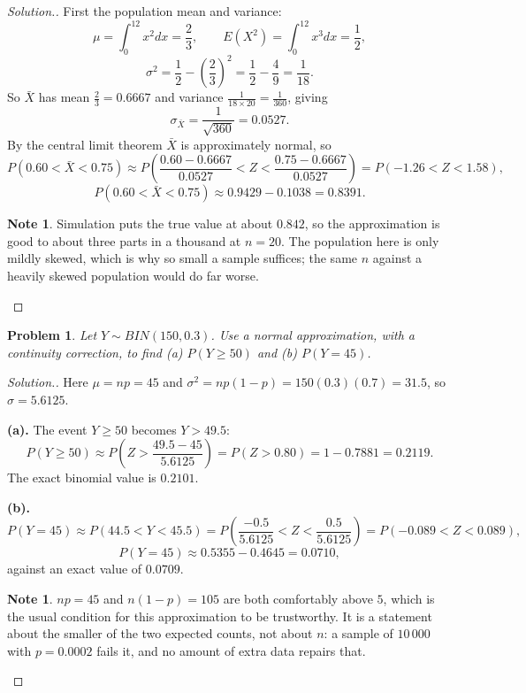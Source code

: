 \documentclass[12pt,a4paper]{report}
\theoremstyle{definition}
\newtheorem{note}[thm]{Note}
\theoremstyle{plain}
\newtheorem{problemx}{Problem}[section]
\newenvironment{problem}{\begin{problemx}}{\end{problemx}}
\newenvironment{solution}
  {\renewcommand{\qedsymbol}{}\begin{proof}[\textit{Solution}.]}
  {\end{proof}}
\begin{document}
\begin{solution}
First the population mean and variance:
\[\mu=\int_0^12x^2dx=\frac23,\qquad
E\left(X^2\right)=\int_0^12x^3dx=\frac12,\]
\[\sigma^2=\frac12-\left(\frac23\right)^2=\frac12-\frac49=\frac{1}{18}.\]
So $\bar X$ has mean $\frac23=0.6667$ and variance
$\frac{1}{18\times20}=\frac{1}{360}$, giving
\[\sigma_{\bar X}=\frac{1}{\sqrt{360}}=0.0527.\]
By the central limit theorem $\bar X$ is approximately normal, so
\[P\left(0.60<\bar X<0.75\right)
\approx P\!\left(\frac{0.60-0.6667}{0.0527}<Z<\frac{0.75-0.6667}{0.0527}\right)
=P(-1.26<Z<1.58),\]
\[P\left(0.60<\bar X<0.75\right)\approx0.9429-0.1038=0.8391.\]

\begin{note}
Simulation puts the true value at about $0.842$, so the approximation is good to
about three parts in a thousand at $n=20$. The population here is only mildly
skewed, which is why so small a sample suffices; the same $n$ against a heavily
skewed population would do far worse.
\end{note}
\end{solution}

\begin{problem}
Let $Y\sim BIN(150,0.3)$. Use a normal approximation, with a continuity
correction, to find (a) $P(Y\geq50)$ and (b) $P(Y=45)$.
\end{problem}

\begin{solution}
Here $\mu=np=45$ and $\sigma^2=np(1-p)=150(0.3)(0.7)=31.5$, so
$\sigma=5.6125$.

\textbf{(a).} The event $Y\geq50$ becomes $Y>49.5$:
\[P(Y\geq50)\approx P\!\left(Z>\frac{49.5-45}{5.6125}\right)=P(Z>0.80)
=1-0.7881=0.2119.\]
The exact binomial value is $0.2101$.

\textbf{(b).}
\[P(Y=45)\approx P\left(44.5<Y<45.5\right)
=P\!\left(\frac{-0.5}{5.6125}<Z<\frac{0.5}{5.6125}\right)=P(-0.089<Z<0.089),\]
\[P(Y=45)\approx0.5355-0.4645=0.0710,\]
against an exact value of $0.0709$.

\begin{note}
$np=45$ and $n(1-p)=105$ are both comfortably above $5$, which is the usual
condition for this approximation to be trustworthy. It is a statement about the
smaller of the two expected counts, not about $n$: a sample of $10\,000$ with
$p=0.0002$ fails it, and no amount of extra data repairs that.
\end{note}
\end{solution}
\end{document}
